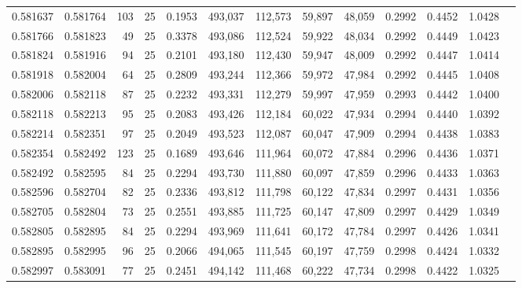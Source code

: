 \begin{tabular}{rrrrrrrrrrrrr}
0.581637 & 0.581764 &   103 &  25 &                                     0.1953 & 493,037 & 112,573 &  59,897 &  48,059 & 0.2992 & 0.4452 & 1.0428 \\
0.581766 & 0.581823 &    49 &  25 &                                     0.3378 & 493,086 & 112,524 &  59,922 &  48,034 & 0.2992 & 0.4449 & 1.0423 \\
0.581824 & 0.581916 &    94 &  25 &                                     0.2101 & 493,180 & 112,430 &  59,947 &  48,009 & 0.2992 & 0.4447 & 1.0414 \\
0.581918 & 0.582004 &    64 &  25 &                                     0.2809 & 493,244 & 112,366 &  59,972 &  47,984 & 0.2992 & 0.4445 & 1.0408 \\
0.582006 & 0.582118 &    87 &  25 &                                     0.2232 & 493,331 & 112,279 &  59,997 &  47,959 & 0.2993 & 0.4442 & 1.0400 \\
0.582118 & 0.582213 &    95 &  25 &                                     0.2083 & 493,426 & 112,184 &  60,022 &  47,934 & 0.2994 & 0.4440 & 1.0392 \\
0.582214 & 0.582351 &    97 &  25 &                                     0.2049 & 493,523 & 112,087 &  60,047 &  47,909 & 0.2994 & 0.4438 & 1.0383 \\
0.582354 & 0.582492 &   123 &  25 &                                     0.1689 & 493,646 & 111,964 &  60,072 &  47,884 & 0.2996 & 0.4436 & 1.0371 \\
0.582492 & 0.582595 &    84 &  25 &                                     0.2294 & 493,730 & 111,880 &  60,097 &  47,859 & 0.2996 & 0.4433 & 1.0363 \\
0.582596 & 0.582704 &    82 &  25 &                                     0.2336 & 493,812 & 111,798 &  60,122 &  47,834 & 0.2997 & 0.4431 & 1.0356 \\
0.582705 & 0.582804 &    73 &  25 &                                     0.2551 & 493,885 & 111,725 &  60,147 &  47,809 & 0.2997 & 0.4429 & 1.0349 \\
0.582805 & 0.582895 &    84 &  25 &                                     0.2294 & 493,969 & 111,641 &  60,172 &  47,784 & 0.2997 & 0.4426 & 1.0341 \\
0.582895 & 0.582995 &    96 &  25 &                                     0.2066 & 494,065 & 111,545 &  60,197 &  47,759 & 0.2998 & 0.4424 & 1.0332 \\
0.582997 & 0.583091 &    77 &  25 &                                     0.2451 & 494,142 & 111,468 &  60,222 &  47,734 & 0.2998 & 0.4422 & 1.0325 \\

\end{tabular}

